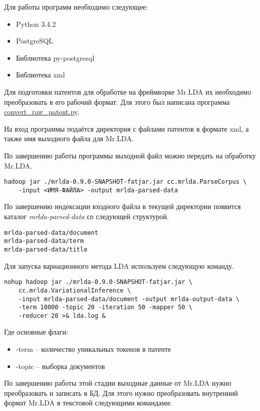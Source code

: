 Для работы программ необходимо следующее:
\begin{itemize}
    \item Python 3.4.2
    \item PostgreSQL
    \item Библиотека py-postgresql
    \item Библиотека xml
\end{itemize}

Для подготовки патентов для обработке на фреймворке Mr.LDA их необходимо преобразовать в его рабочий 
формат. Для этого был написана программа \href{https://github.com/SemPatent/Golubev/blob/master/convert_raw_patent.py}{convert\_raw\_patent.py}.

На вход программы подаётся директория с файлами патентов в формате xml, а также имя выходного файла 
для Mr.LDA.

По завершению работы программы выходной файл можно передать на обработку Mr.LDA. 
\begin{verbatim}
hadoop jar ./mrlda-0.9.0-SNAPSHOT-fatjar.jar cc.mrlda.ParseCorpus \
    -input <ИМЯ-ФАЙЛА> -output mrlda-parsed-data
\end{verbatim}

По завершению индексации входного файла в текущей директории появится каталог \emph{mrlda-parsed-data} 
со следующей структурой.
\begin{verbatim}
mrlda-parsed-data/document
mrlda-parsed-data/term
mrlda-parsed-data/title
\end{verbatim}

Для запуска вариационного метода LDA используем следующую команду. 
\begin{verbatim}
nohup hadoop jar ./mrlda-0.9.0-SNAPSHOT-fatjar.jar \
    cc.mrlda.VariationalInference \
    -input mrlda-parsed-data/document -output mrlda-output-data \
    -term 10000 -topic 20 -iteration 50 -mapper 50 \
    -reducer 20 >& lda.log &
\end{verbatim}

\pagebreak

Где основные флаги:
\begin{itemize}
    \item -term -- количество уникальных токенов в патенте
    \item -topic -- выборка документов
\end{itemize}

По завершению работы этой стадии выходные данные от Mr.LDA нужно преобразовать и записать в БД. 
Для этого нужно преобразовать внутренний формат Mr.LDA в текстовой следующими командами:

